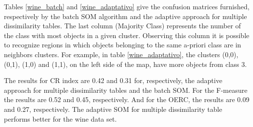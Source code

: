\documentclass[10pt, conference, compsocconf]{IEEEtran}
\begin{document}
Tables \ref{wine_batch} and \ref{wine_adaptativo} give the confusion matrices furnished, respectively by the batch SOM algorithm and the adaptive approach for multiple dissimilarity tables. The last column (Majority Class) represents the number of the class with most objects in a given cluster. Observing this column it is possible to recognize regions in which objects belonging to the same a-priori class are in neighbors clusters. For example, in table \ref{wine_adaptativo}, the clusters (0,0), (0,1), (1,0) and (1,1), on the left side of the map, have more objects from class 3.


The results for CR index are 0.42 and 0.31 for, respectively, the adaptive approach for multiple dissimilarity tables and the batch SOM. For the F-measure the results are 0.52 and 0.45, respectively. And for the OERC, the results are 0.09 and 0.27, respectively. The adaptive SOM for multiple dissimilarity table performs better for the wine data set.
\end{document}
